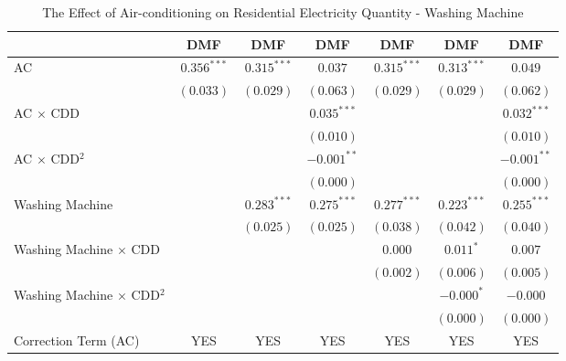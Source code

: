 
\begin{table}[htbp]
\caption{The Effect of Air-conditioning on Residential Electricity Quantity - Washing Machine}
\begin{center}
\begin{tabular}{l c c c c c c}
\hline
 & DMF & DMF & DMF & DMF & DMF & DMF \\
\hline
AC                                & $0.356^{***}$ & $0.315^{***}$ & $0.037$       & $0.315^{***}$ & $0.313^{***}$ & $0.049$       \\
                                  & $(0.033)$     & $(0.029)$     & $(0.063)$     & $(0.029)$     & $(0.029)$     & $(0.062)$     \\
AC $\times$ CDD                   &               &               & $0.035^{***}$ &               &               & $0.032^{***}$ \\
                                  &               &               & $(0.010)$     &               &               & $(0.010)$     \\
AC $\times$ CDD$^2$               &               &               & $-0.001^{**}$ &               &               & $-0.001^{**}$ \\
                                  &               &               & $(0.000)$     &               &               & $(0.000)$     \\
Washing Machine                   &               & $0.283^{***}$ & $0.275^{***}$ & $0.277^{***}$ & $0.223^{***}$ & $0.255^{***}$ \\
                                  &               & $(0.025)$     & $(0.025)$     & $(0.038)$     & $(0.042)$     & $(0.040)$     \\
Washing Machine $\times$ CDD      &               &               &               & $0.000$       & $0.011^{*}$   & $0.007$       \\
                                  &               &               &               & $(0.002)$     & $(0.006)$     & $(0.005)$     \\
Washing Machine $\times$ CDD$^2$  &               &               &               &               & $-0.000^{*}$  & $-0.000$      \\
                                  &               &               &               &               & $(0.000)$     & $(0.000)$     \\
\hline
Correction Term (AC)              & YES           & YES           & YES           & YES           & YES           & YES           \\

\end{tabular}
\end{center}
\end{table}

